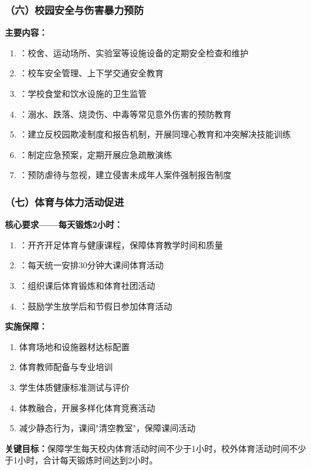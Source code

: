 \subsubsection{（六）校园安全与伤害暴力预防}

\begin{defbox}
\textbf{主要内容：}
\begin{enumerate}[leftmargin=*]
    \item {}：校舍、运动场所、实验室等设施设备的定期安全检查和维护
    \item {}：校车安全管理、上下学交通安全教育
    \item {}：学校食堂和饮水设施的卫生监管
    \item {}：溺水、跌落、烧烫伤、中毒等常见意外伤害的预防教育
    \item {}：建立反校园欺凌制度和报告机制，开展同理心教育和冲突解决技能训练
    \item {}：制定应急预案，定期开展应急疏散演练
    \item {}：预防虐待与忽视，建立侵害未成年人案件强制报告制度
\end{enumerate}
\end{defbox}

\subsubsection{（七）体育与体力活动促进}

\begin{keybox}
\textbf{核心要求——每天锻炼2小时：}
\begin{enumerate}[leftmargin=*]
    \item {}：开齐开足体育与健康课程，保障体育教学时间和质量
    \item {}：每天统一安排30分钟大课间体育活动
    \item {}：组织课后体育锻炼和体育社团活动
    \item {}：鼓励学生放学后和节假日参加体育活动
\end{enumerate}

\textbf{实施保障：}
\begin{enumerate}[leftmargin=*]
    \item 体育场地和设施器材达标配置
    \item 体育教师配备与专业培训
    \item 学生体质健康标准测试与评价
    \item 体教融合，开展多样化体育竞赛活动
    \item 减少静态行为，课间"清空教室"，保障课间活动
\end{enumerate}

\textbf{关键目标：}保障学生每天校内体育活动时间不少于1小时，校外体育活动时间不少于1小时，合计每天锻炼时间达到2小时。
\end{keybox}

